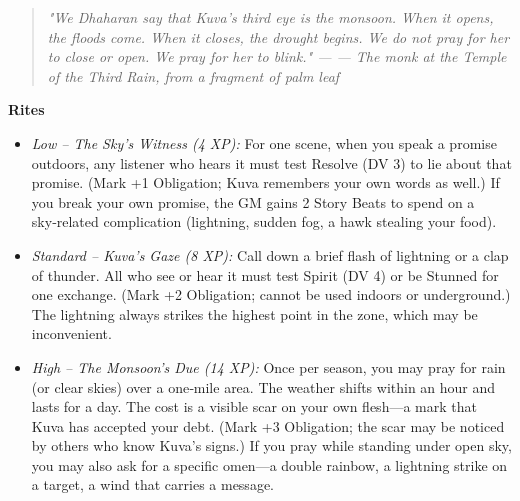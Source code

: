 \documentclass[12pt]{book}
\newcommand{\letter}[2]{%
    \begin{quote}\small\itshape #1 \hfill --- #2\end{quote}}
\begin{document}
\letter{"We Dhaharan say that Kuva's third eye is the monsoon. When it opens, the floods come. When it closes, the drought begins. We do not pray for her to close or open. We pray for her to blink."}{--- The monk at the Temple of the Third Rain, from a fragment of palm leaf}

\begin{infobox}
\textbf{Rites}
\begin{itemize}
    \item \textit{Low -- The Sky's Witness (4 XP):} For one scene, when you speak a promise outdoors, any listener who hears it must test Resolve (DV 3) to lie about that promise. (Mark +1 Obligation; Kuva remembers your own words as well.) If you break your own promise, the GM gains 2 Story Beats to spend on a sky‑related complication (lightning, sudden fog, a hawk stealing your food).
    \item \textit{Standard -- Kuva's Gaze (8 XP):} Call down a brief flash of lightning or a clap of thunder. All who see or hear it must test Spirit (DV 4) or be Stunned for one exchange. (Mark +2 Obligation; cannot be used indoors or underground.) The lightning always strikes the highest point in the zone, which may be inconvenient.
    \item \textit{High -- The Monsoon's Due (14 XP):} Once per season, you may pray for rain (or clear skies) over a one‑mile area. The weather shifts within an hour and lasts for a day. The cost is a visible scar on your own flesh---a mark that Kuva has accepted your debt. (Mark +3 Obligation; the scar may be noticed by others who know Kuva's signs.) If you pray while standing under open sky, you may also ask for a specific omen---a double rainbow, a lightning strike on a target, a wind that carries a message.
\end{itemize}
\end{infobox}
\end{document}
